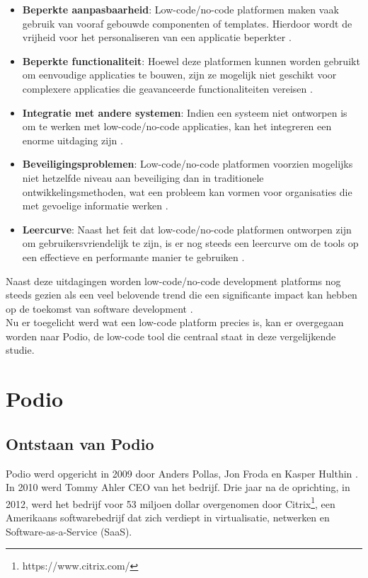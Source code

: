 \begin{itemize}
    \item \textbf{Beperkte aanpasbaarheid}: Low-code/no-code platformen maken vaak gebruik van vooraf gebouwde componenten of templates. Hierdoor wordt de vrijheid voor het personaliseren van een applicatie beperkter \autocite{Yan2021}.
    \item \textbf{Beperkte functionaliteit}: Hoewel deze platformen kunnen worden gebruikt om eenvoudige applicaties te bouwen, zijn ze mogelijk niet geschikt voor complexere applicaties die geavanceerde functionaliteiten vereisen \autocite{Yan2021}.
    \item \textbf{Integratie met andere systemen}: Indien een systeem niet ontworpen is om te werken met low-code/no-code applicaties, kan het integreren een enorme uitdaging zijn \autocite{Ferreira2019}.
    \item \textbf{Beveiligingsproblemen}: Low-code/no-code platformen voorzien mogelijks niet hetzelfde niveau aan beveiliging dan in traditionele ontwikkelingsmethoden, wat een probleem kan vormen voor organisaties die met gevoelige informatie werken \autocite{Ploder2019}.
    \item \textbf{Leercurve}: Naast het feit dat low-code/no-code platformen ontworpen zijn om gebruikersvriendelijk te zijn, is er nog steeds een leercurve om de tools op een effectieve en performante manier te gebruiken \autocite{Yan2021}.  
\end{itemize}

Naast deze uitdagingen worden low-code/no-code development platforms nog steeds gezien als een veel belovende trend die een significante impact kan hebben op de toekomst van software development \autocite{Yan2021}. \\

Nu er toegelicht werd wat een low-code platform precies is, kan er overgegaan worden naar Podio, de low-code tool die centraal staat in deze vergelijkende studie.

\section{Podio}
\label{sec:podio}

\subsection{Ontstaan van Podio}
\label{subsec:ontstaan_podio}

Podio werd opgericht in 2009 door Anders Pollas, Jon Froda en Kasper Hulthin \autocite{Crunchbase}. In 2010 werd Tommy Ahler CEO van het bedrijf. Drie jaar na de oprichting, in 2012, werd het bedrijf voor 53 miljoen dollar overgenomen door Citrix\footnote{https://www.citrix.com/}, een Amerikaans softwarebedrijf dat zich verdiept in virtualisatie, netwerken en Software-as-a-Service (SaaS). \\

